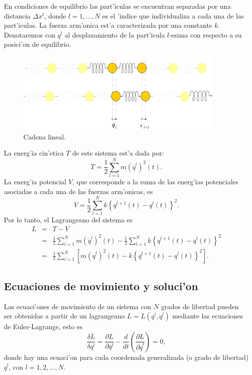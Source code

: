 En condiciones de equilibrio las part'iculas se encuentran separadas por una
distancia $\Delta x^{l}$, donde $l=1,\dots, N$ es el 'indice que individualiza a
cada una de las part'iculas. La fuerza arm'onica est'a caracterizada por una
constante $k$. Denotaremos con $q^{l}$ al desplazamiento de la part'icula
$l$-esima con respecto a su posici'on de equilibrio.
\begin{figure}
	\includegraphics[height=4cm]{figs/fig-cadena.pdf}
	\caption{Cadena lineal.}
	\label{fig:cadena}
\end{figure}
La energ'ia cin'etica $T$ de este sistema est'a dada por:
\begin{equation}
T=\frac{1}{2}\sum_{l=1}^{N}m(\dot{q}^{l})^{2}(t).
\end{equation}
La energ'ia potencial $V$, que corresponde a la suma de las energ'ias
potenciales asociadas a cada una de las fuerzas arm'onicas, es
\begin{equation}
V=\frac{1}{2}\sum_{l=1}^{N}k\left\{ q^{l+1}(t) -q^{l}\left(
t\right) \right\} ^{2}.
\end{equation}
Por lo tanto, el Lagrangeano del sistema es
\begin{eqnarray}
L & = &T-V\\
& = &\frac{1}{2}\sum_{l=1}^{N}m(\dot{q}^{l})^{2}(t) -\frac{1}{2}
\sum_{l=1}^{N}k\left\{ q^{l+1}(t) -q^{l}(t)
\right\} ^{2}\\
& = &\frac{1}{2}\sum_{l=1}^{N}\left[ m(\dot{q}^{l})^{2}(t)
-k\left\{ q^{l+1}(t) -q^{l}(t) \right\}
^{2}\right].
\label{CLC}
\end{eqnarray}

\subsection{Ecuaciones de movimiento y soluci'on}
Las ecuaci'ones de movimiento de un sistema con $N$ grados de libertad pueden
ser obtenidas a partir de un lagrangeano $L=L\left(
q^{l},\dot{q}^{l}\right) $ mediante las ecuaciones de
Euler-Lagrange, esto es
\begin{equation}
\frac{\delta L}{\delta q^l}=\frac{\partial L}{\partial q^{l}}-\frac{d}{dt}\left(
\frac{\partial L}{\partial\dot{q}^{l}}\right) =0\label{EcMov1},
\end{equation}
donde hay una ecuaci'on para cada coordenada generalizada (o grado de libertad)
$q^{l}$, con $l=1,2,\dots,N$.

